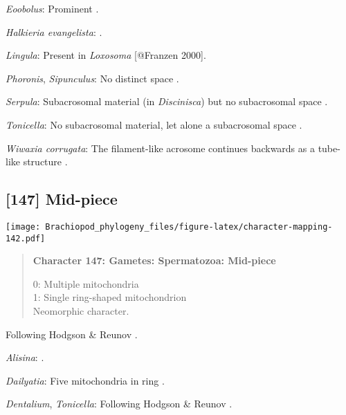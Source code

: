 \documentclass[openany]{book}
\theoremstyle{definition}
\theoremstyle{definition}
\theoremstyle{definition}
\theoremstyle{remark}
\begin{document}
\hypertarget{Eoobolus-coding-146}{}
\emph{Eoobolus}: Prominent \citep{Afzelius1978Finestructure}.

\hypertarget{Halkieria_evangelista-coding-146}{}
\emph{Halkieria evangelista}: \citet{Rice1993}.

\hypertarget{Lingula-coding-146}{}
\emph{Lingula}: Present in \emph{Loxosoma} {[}@Franzen 2000{]}.

\hypertarget{Phoronis-coding-146}{}
\emph{Phoronis}, \emph{Sipunculus}: No distinct space \citep[in
\emph{Tubulipora};][]{Franzen1984}.

\hypertarget{Serpula-coding-146}{}
\emph{Serpula}: Subacrosomal material (in \emph{Discinisca}) but no
subacrosomal space \citep{Hodgson1994Ultrastructureof}.

\hypertarget{Tonicella-coding-146}{}
\emph{Tonicella}: No subacrosomal material, let alone a subacrosomal
space \citep[e.g.][]{Hodgson1994Ultrastructureof}.

\hypertarget{Wiwaxia_corrugata-coding-146}{}
\emph{Wiwaxia corrugata}: The filament-like acrosome continues backwards
as a tube-like structure \citep[summarized in
\citet{Jamieson1991FishEvolution}]{Franzen1980Ultrastructureof}.

\subsection*{{[}147{]} Mid-piece}\label{mid-piece}

\texttt{[image: Brachiopod\_phylogeny\_files/figure-latex/character-mapping-142.pdf]}

\begin{quote}
\textbf{Character 147: Gametes: Spermatozoa: Mid-piece}

0: Multiple mitochondria\\
1: Single ring-shaped mitochondrion\\
Neomorphic character.
\end{quote}

Following Hodgson \& Reunov \citeyearpar{Hodgson1994Ultrastructureof}.

\hypertarget{Alisina-coding-147}{}
\emph{Alisina}: \citet{DufresneDube1983}.

\hypertarget{Dailyatia-coding-147}{}
\emph{Dailyatia}: Five mitochondria in ring \citep{Gherardi2011}.

\hypertarget{Dentalium-coding-147}{}
\emph{Dentalium}, \emph{Tonicella}: Following Hodgson \& Reunov
\citeyearpar{Hodgson1994Ultrastructureof}.
\end{document}
